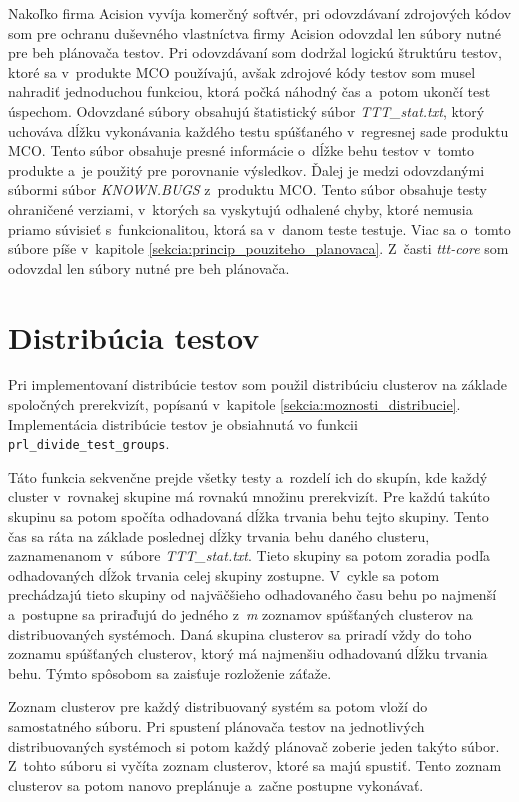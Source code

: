 Nakoľko firma Acision vyvíja komerčný softvér, pri odovzdávaní zdrojových 
kódov  som pre ochranu duševného vlastníctva firmy Acision odovzdal len 
súbory nutné pre beh plánovača testov. 
Pri odovzdávaní som dodržal logickú štruktúru testov, ktoré sa
v~produkte MCO používajú, avšak zdrojové kódy testov som musel nahradiť 
jednoduchou funkciou, ktorá počká náhodný čas a~potom ukončí test úspechom.
Odovzdané súbory obsahujú štatistický súbor \textit{TTT\_stat.txt}, 
ktorý uchováva dĺžku vykonávania každého testu spúšťaného v~regresnej 
sade produktu MCO. Tento súbor obsahuje presné informácie o~dĺžke
behu testov v~tomto produkte a~je použitý pre porovnanie výsledkov.
Ďalej je medzi odovzdanými súbormi súbor \textit{KNOWN.BUGS} z~produktu MCO. 
Tento súbor obsahuje testy ohraničené verziami, v~ktorých sa vyskytujú 
odhalené chyby, ktoré nemusia priamo súvisieť s~funkcionalitou, ktorá sa 
v~danom teste testuje. Viac sa o~tomto súbore píše v~kapitole 
\ref{sekcia:princip_pouziteho_planovaca}.
Z~časti \textit{ttt-core} som odovzdal len súbory nutné pre beh plánovača. 

\section{Distribúcia testov}
\label{sekcia:distribucia_testov}
Pri implementovaní distribúcie testov som použil distribúciu clusterov 
na základe spoločných prerekvizít, popísanú v~kapitole 
\ref{sekcia:moznosti_distribucie}.
Implementácia distribúcie testov je obsiahnutá vo funkcii 
\texttt{prl\_divide\_test\_groups}.

Táto funkcia sekvenčne prejde všetky testy a~rozdelí ich do skupín, 
kde každý cluster v~rovnakej skupine má rovnakú množinu prerekvizít. 
Pre každú takúto skupinu sa potom spočíta odhadovaná dĺžka trvania behu tejto skupiny.
Tento čas sa ráta na základe poslednej dĺžky trvania behu daného clusteru, 
zaznamenanom v~súbore \textit{TTT\_stat.txt}.
Tieto skupiny sa potom zoradia podľa odhadovaných dĺžok trvania celej 
skupiny zostupne. V~cykle sa potom prechádzajú tieto skupiny od 
najväčšieho odhadovaného času behu po najmenší a~postupne sa priraďujú 
do jedného z~\emph{m} zoznamov spúšťaných clusterov na distribuovaných systémoch.
Daná skupina clusterov sa priradí vždy do toho zoznamu spúšťaných clusterov, 
ktorý má najmenšiu odhadovanú dĺžku trvania behu. 
Týmto spôsobom sa zaisťuje rozloženie záťaže. 

Zoznam clusterov pre každý distribuovaný systém sa potom vloží do 
samostatného súboru. Pri spustení plánovača testov na jednotlivých 
distribuovaných systémoch si potom každý plánovač zoberie jeden 
takýto súbor. Z~tohto súboru si vyčíta zoznam clusterov, ktoré sa 
majú spustiť. Tento zoznam clusterov sa potom nanovo preplánuje a~začne 
postupne vykonávať.

